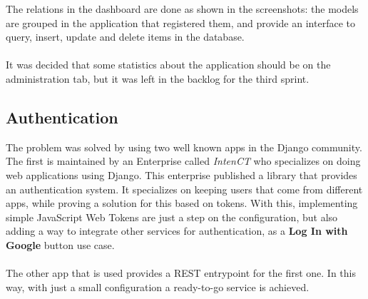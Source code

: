 \documentclass[./main.tex]{subfiles}
\begin{document}
The relations in the dashboard are done as shown in the screenshots: the
models are grouped in the application that registered them, and provide
an interface to query, insert, update and delete items in the database.
\\
\\

It was decided that some statistics about the application should be on
the administration tab, but it was left in the backlog for the third
sprint.


\subsection{Authentication}

The problem was solved by using two well known apps in the Django
community. The first is maintained by an Enterprise called \emph{IntenCT}
who specializes on doing web applications using Django. This enterprise
published a library that provides an authentication system. It
specializes on keeping users that come from different apps, while
proving a solution for this based on tokens. With this, implementing
simple JavaScript Web Tokens are just a step on the configuration, but
also adding a way to integrate other services for authentication, as a
\textbf{Log In with Google} button use case.\\
\\
The other app that is used provides a REST entrypoint for the first one.
In this way, with just a small configuration a ready-to-go service is
achieved.
\end{document}

